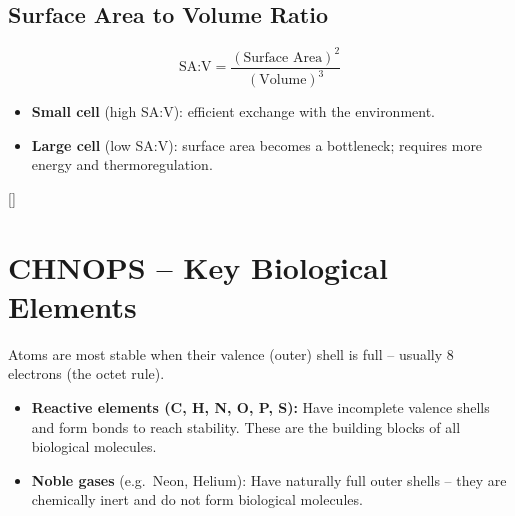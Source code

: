 \documentclass[11pt, letterpaper]{article}
\newcommand{\bluesections}{%
  \titleformat{\section}{\large\bfseries\color{sectionblue}}{}{0em}{}[\color{sectionblue}\titlerule]%
  \titleformat{\subsection}{\normalsize\bfseries\color{sectionblue!80!black}}{}{0em}{}%
}
\begin{document}
\subsection*{Surface Area to Volume Ratio}
\[
  \text{SA:V} = \frac{(\text{Surface Area})^2}{(\text{Volume})^3}
\]
\begin{itemize}[noitemsep]
  \item \textbf{Small cell} (high SA:V): efficient exchange with the environment.
  \item \textbf{Large cell} (low SA:V): surface area becomes a bottleneck; requires more energy and thermoregulation.
\end{itemize}

\newpage

\bluesections
\section*{CHNOPS -- Key Biological Elements}

\begin{tcolorbox}[colback=craapbg, colframe=craapborder,
  title={\bfseries The Octet Rule \& Stability}, arc=4pt, boxrule=1pt]
Atoms are most stable when their valence (outer) shell is full -- usually 8 electrons (the octet rule).
\begin{itemize}[noitemsep, leftmargin=*]
  \item \textbf{Reactive elements (C, H, N, O, P, S):} Have incomplete valence shells and form bonds to reach stability. These are the building blocks of all biological molecules.
  \item \textbf{Noble gases} (e.g.\ Neon, Helium): Have naturally full outer shells -- they are chemically inert and do not form biological molecules.
\end{itemize}
\end{tcolorbox}

\vspace{6pt}
\end{document}
